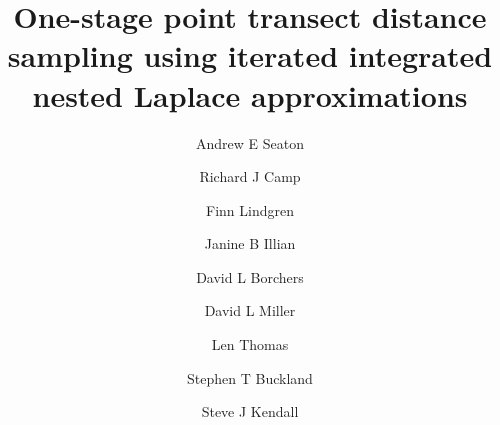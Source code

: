 \documentclass[preprint,12pt]{elsarticle}
\newcommand{\hawaii}{Hawai\textquotesingle i}   %
\begin{document}
\begin{frontmatter}
\title{One-stage point transect distance sampling using iterated integrated nested Laplace approximations}




\author[1,*]{Andrew E Seaton}
\author[1,2]{Richard J Camp}
\author[3]{Finn Lindgren}
\author[1]{Janine B Illian}
\author[1]{David L Borchers}
\author[1]{David L Miller}      %
\author[1]{Len Thomas}          %
\author[1]{Stephen T Buckland}  %
\author[4]{Steve J Kendall}     %

\address[1]{Centre for Research into Ecological \& Environmental Modelling and School of Mathematics \& Statistics, University of St Andrews, St Andrews, Fife, Scotland}
\address[2]{U. S. Geological Survey, Pacific Island Ecosystems Research Center, P.O. Box 44, \hawaii{} National Park, HI 96718, U.S.A.}
\address[3]{School of Mathematics, University of Edinburgh, Edinburgh, Scotland}
\address[4]{U. S. Fish and Wildlife, Big Island National Wildlife Refuge Complex, 60 Nowelo St., Suite 100, Hilo, HI  96720, U.S.A.}
\address[*]{Correspondence: Andrew E Seaton, Email: aes22@st-andrews.ac.uk}


\end{frontmatter}
\end{document}
